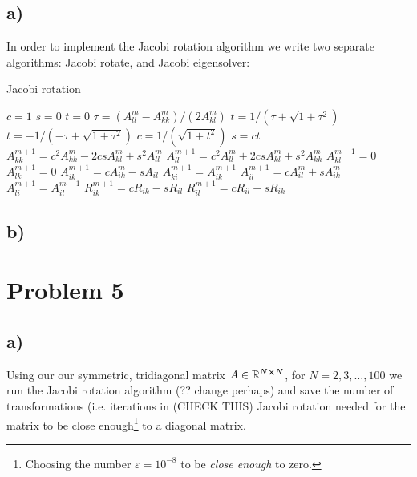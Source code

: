 \documentclass[english,notitlepage,nofootinbib]{revtex4-1}  %
\begin{document}
\subsection*{a)}
In order to implement the Jacobi rotation algorithm we write two separate algorithms: Jacobi rotate, and Jacobi eigensolver:
\begin{algorithm}[H]
    \caption{Jacobi rotation}\label{algo:p4_jacobi_rotation}
    \begin{algorithmic}
            \State $c=1$
            \State $s=0$
            \State $t=0$
        \Else 
            \State $\tau = (A_{ll}^m-A_{kk}^m) / (2A_{kl}^m)$
                \State $t= 1/(\tau + \sqrt{1+\tau^2})$
            \Else
                \State $t = -1/(-\tau + \sqrt{1+\tau^2})$
            \EndIf
            \State $c=1/(\sqrt{1+t^2})$
            \State $s=ct$
        \EndIf
        \State $A_{kk}^{m+1} = c^2A_{kk}^m - 2csA_{kl}^m + s^2A_{ll}^m$
        \State $A_{ll}^{m+1} = c^2A_{ll}^m + 2csA_{kl}^m + s^2A_{kk}^m$
        \State $A_{kl}^{m+1} = 0$
        \State $A_{lk}^{m+1} = 0$
                \State $A_{ik}^{m+1} = cA_{ik}^m -sA_{il} $
                \State $A_{ki}^{m+1} = A_{ik}^{m+1}$
                \State $A_{il}^{m+1} = cA_{il}^m + sA_{ik}^m$
                \State $A_{li}^{m+1} = A_{il}^{m+1}$
            \EndIf
            \State $R_{ik}^{m+1} = cR_{ik} - sR_{il}$
            \State $R_{il}^{m+1} = cR_{il} + sR_{ik}$
        \EndFor
    \end{algorithmic}
\end{algorithm}
\subsection*{b)}



\section*{Problem 5}

\subsection*{a)}

Using our our symmetric, tridiagonal matrix $A \in \mathbb{R}^{N\cross N}$, for $N=2,3,\dots,100$ we run the Jacobi rotation algorithm (?? change perhaps) and save the number of transformations (i.e. iterations in (CHECK THIS) Jacobi rotation needed for the matrix to be close enough\footnote{Choosing the number $\varepsilon=10^{-8}$ to be \textit{close enough} to zero.} to a diagonal matrix.
\end{document}
